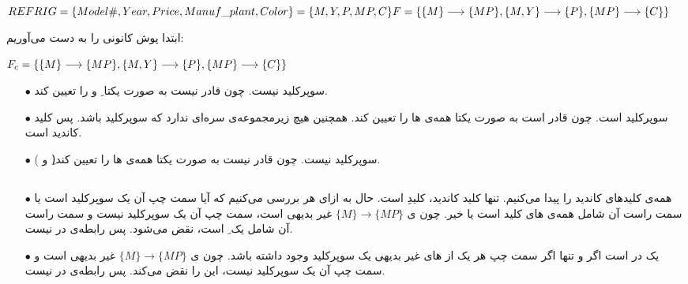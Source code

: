 \documentclass{article}
\begin{document}
\subsection{}
\begin{latin}
$
\\
REFRIG=
\{
Model\#, Year, Price, Manuf\_plant, Color
\}
=\{M, Y, P, MP, C\}
\\
\\
F=\\
\{\\
\{M\}\longrightarrow\{MP\},\\
\{M, Y\}\longrightarrow\{P\},\\
\{MP\}\longrightarrow\{C\}\\
\}
$
\end{latin}
ابتدا پوش کانونی را به دست می‌آوریم:
\begin{latin}
$
\\F_{c}=\\
\{\\
\{M\}\longrightarrow\{MP\},\\
\{M, Y\}\longrightarrow\{P\},\\
\{MP\}\longrightarrow\{C\}\\
\}
$
\end{latin}

\begin{itemize}
    \item [$\bullet$] 
 سوپرکلید نیست. چون قادر نیست به صورت یکتا ِ  و  را تعیین کند.

    \item [$\bullet$] 
 سوپرکلید است. چون قادر است به صورت یکتا همه‌ی ها را تعیین کند. همچنین هیچ زیرمجموعه‌ی سره‌ای ندارد که سوپرکلید باشد. پس کلید کاندید است.

    \item [$\bullet$] 
 سوپرکلید نیست. چون قادر نیست به صورت یکتا همه‌ی ها را تعیین کند(ِ  و ).
\end{itemize}
\subsection{}
\begin{itemize}
    \item [$\bullet$] 
همه‌ی کلیدهای کاندید را پیدا می‌کنیم. تنها کلید کاندید، کلیدِ
است. حال به ازای هر  بررسی می‌کنیم که آیا سمت چپ آن یک سوپرکلید است یا سمت راست آن شامل همه‌ی های کلید است یا خیر. چون ی
$
\{M\}\longrightarrow\{MP\}
$
غیر بدیهی است، سمت چپ آن یک سوپرکلید نیست و سمت راست آن شامل یک ِ  است،  نقض می‌شود. پس رابطه‌ی  در  نیست.
    \item [$\bullet$] 
یک  در  است اگر و تنها اگر سمت چپ هر یک از های غیر بدیهی یک سوپرکلید وجود داشته باشد. چون ی
$
\{M\}\longrightarrow\{MP\}
$
غیر بدیهی است و سمت چپ آن یک سوپرکلید نیست، این  را نقض می‌کند. پس رابطه‌ی  در  نیست.
\end{itemize}
\end{document}
